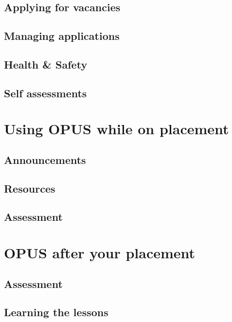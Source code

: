 \documentclass[12 pt]{book}
\begin{document}
\section{Applying for vacancies}

\section{Managing applications}

\section{Health \& Safety}

\section{Self assessments}

%
%
%


\chapter{Using OPUS while on placement}

\section{Announcements}

\section{Resources}

\section{Assessment}

%
%
%

\chapter{OPUS after your placement}

\section{Assessment}

\section{Learning the lessons}

%
%

\printindex
{}
\end{document}
